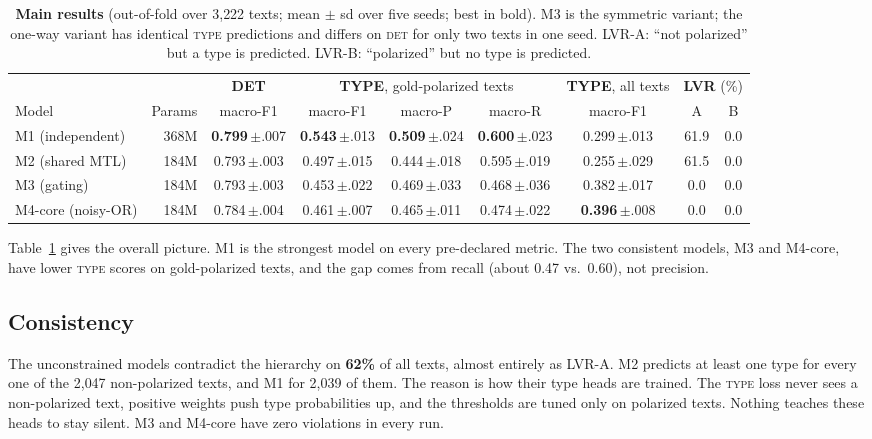 \documentclass[11pt]{article}
\newcommand{\DET}{\textsc{det}}
\newcommand{\TYPE}{\textsc{type}}
\begin{document}
\begin{table}[t]
\centering\small
\begin{tabular}{@{}lrccccccc@{}}
\toprule
& & \textbf{DET} & \multicolumn{3}{c}{\textbf{TYPE}, gold-polarized texts} & \textbf{TYPE}, all texts & \multicolumn{2}{c}{\textbf{LVR} (\%)} \\
\cmidrule(lr){3-3}\cmidrule(lr){4-6}\cmidrule(lr){7-7}\cmidrule(l){8-9}
Model & Params & macro-F1 & macro-F1 & macro-P & macro-R & macro-F1 & A & B \\
\midrule
M1 (independent)   & 368M & \textbf{0.799}\,{\scriptsize$\pm$.007} & \textbf{0.543}\,{\scriptsize$\pm$.013} & \textbf{0.509}\,{\scriptsize$\pm$.024} & \textbf{0.600}\,{\scriptsize$\pm$.023} & 0.299\,{\scriptsize$\pm$.013} & 61.9 & 0.0 \\
M2 (shared MTL)    & 184M & 0.793\,{\scriptsize$\pm$.003} & 0.497\,{\scriptsize$\pm$.015} & 0.444\,{\scriptsize$\pm$.018} & 0.595\,{\scriptsize$\pm$.019} & 0.255\,{\scriptsize$\pm$.029} & 61.5 & 0.0 \\
M3 (gating)        & 184M & 0.793\,{\scriptsize$\pm$.003} & 0.453\,{\scriptsize$\pm$.022} & 0.469\,{\scriptsize$\pm$.033} & 0.468\,{\scriptsize$\pm$.036} & 0.382\,{\scriptsize$\pm$.017} & 0.0 & 0.0 \\
M4-core (noisy-OR) & 184M & 0.784\,{\scriptsize$\pm$.004} & 0.461\,{\scriptsize$\pm$.007} & 0.465\,{\scriptsize$\pm$.011} & 0.474\,{\scriptsize$\pm$.022} & \textbf{0.396}\,{\scriptsize$\pm$.008} & 0.0 & 0.0 \\
\bottomrule
\end{tabular}
\caption{\textbf{Main results} (out-of-fold over 3{,}222 texts; mean $\pm$ sd
over five seeds; best in bold). M3 is the symmetric variant; the one-way
variant has identical \TYPE{} predictions and differs on \DET{} for only two
texts in one seed. LVR-A: ``not polarized'' but a type is predicted. LVR-B:
``polarized'' but no type is predicted.}
\label{tab:main}
\end{table}

Table~\ref{tab:main} gives the overall picture. M1 is the strongest model on
every pre-declared metric. The two consistent models, M3 and M4-core, have
lower \TYPE{} scores on gold-polarized texts, and the gap comes from recall
(about 0.47 vs.\ 0.60), not precision.

\subsection{Consistency}
The unconstrained models contradict the hierarchy on \textbf{62\%} of all
texts, almost entirely as LVR-A. M2 predicts at least one type for every one
of the 2{,}047 non-polarized texts, and M1 for 2{,}039 of them. The reason
is how their type heads are trained. The \TYPE{} loss never sees a
non-polarized text, positive weights push type probabilities up, and the
thresholds are tuned only on polarized texts. Nothing teaches these heads to
stay silent. M3 and M4-core have zero violations in every run.
\end{document}
